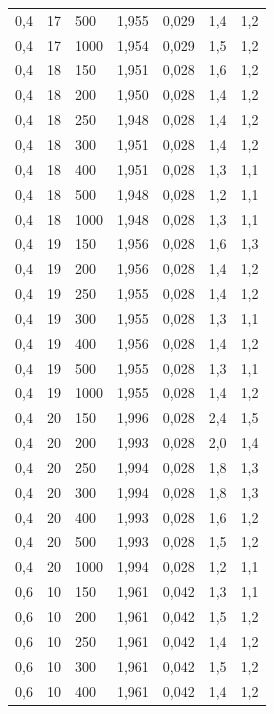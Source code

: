 \begin{tabular}{lllllll}
        0,4 & 17 & 500 & 1,955 & 0,029 & 1,4 & 1,2 \\ 
        0,4 & 17 & 1000 & 1,954 & 0,029 & 1,5 & 1,2 \\ 
        0,4 & 18 & 150 & 1,951 & 0,028 & 1,6 & 1,2 \\ 
        0,4 & 18 & 200 & 1,950 & 0,028 & 1,4 & 1,2 \\ 
        0,4 & 18 & 250 & 1,948 & 0,028 & 1,4 & 1,2 \\ 
        0,4 & 18 & 300 & 1,951 & 0,028 & 1,4 & 1,2 \\ 
        0,4 & 18 & 400 & 1,951 & 0,028 & 1,3 & 1,1 \\ 
        0,4 & 18 & 500 & 1,948 & 0,028 & 1,2 & 1,1 \\ 
        0,4 & 18 & 1000 & 1,948 & 0,028 & 1,3 & 1,1 \\ 
        0,4 & 19 & 150 & 1,956 & 0,028 & 1,6 & 1,3 \\ 
        0,4 & 19 & 200 & 1,956 & 0,028 & 1,4 & 1,2 \\ 
        0,4 & 19 & 250 & 1,955 & 0,028 & 1,4 & 1,2 \\ 
        0,4 & 19 & 300 & 1,955 & 0,028 & 1,3 & 1,1 \\ 
        0,4 & 19 & 400 & 1,956 & 0,028 & 1,4 & 1,2 \\ 
        0,4 & 19 & 500 & 1,955 & 0,028 & 1,3 & 1,1 \\ 
        0,4 & 19 & 1000 & 1,955 & 0,028 & 1,4 & 1,2 \\ 
        0,4 & 20 & 150 & 1,996 & 0,028 & 2,4 & 1,5 \\ 
        0,4 & 20 & 200 & 1,993 & 0,028 & 2,0 & 1,4 \\ 
        0,4 & 20 & 250 & 1,994 & 0,028 & 1,8 & 1,3 \\ 
        0,4 & 20 & 300 & 1,994 & 0,028 & 1,8 & 1,3 \\ 
        0,4 & 20 & 400 & 1,993 & 0,028 & 1,6 & 1,2 \\ 
        0,4 & 20 & 500 & 1,993 & 0,028 & 1,5 & 1,2 \\ 
        0,4 & 20 & 1000 & 1,994 & 0,028 & 1,2 & 1,1 \\ 
        0,6 & 10 & 150 & 1,961 & 0,042 & 1,3 & 1,1 \\ 
        0,6 & 10 & 200 & 1,961 & 0,042 & 1,5 & 1,2 \\ 
        0,6 & 10 & 250 & 1,961 & 0,042 & 1,4 & 1,2 \\ 
        0,6 & 10 & 300 & 1,961 & 0,042 & 1,5 & 1,2 \\ 
        0,6 & 10 & 400 & 1,961 & 0,042 & 1,4 & 1,2 \\ 

\end{tabular}
